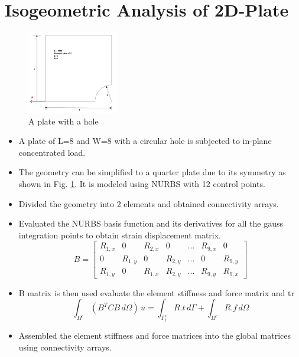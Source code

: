 \documentclass{beamer}
\begin{document}
\section{Isogeometric Analysis of 2D-Plate}
    \begin{figure}
    \begin{center}
    \includegraphics[width=4cm]{figures/plate2.png}
    \end{center}
    \caption{A plate with a hole}\label{Plate}
\end{figure}
  \begin{itemize}
    \item A plate of L=8 and W=8 with a circular hole is subjected to in-plane concentrated load.

    \item The geometry can be simplified to a quarter plate due to its symmetry as shown in Fig. \ref{Plate}. It is modeled using NURBS with 12 control points.

  \end{itemize}
  \newpage
  \begin{itemize}
    \item Divided the geometry into 2 elements and obtained connectivity arrays.
    \item Evaluated the NURBS basis function and its derivatives for all the gauss integration points to obtain strain displacement matrix.
    \begin{equation*}
        B=\begin{bmatrix}
        R_{1,x} & 0 & R_{2,x} & 0 & \dots & R_{9,x} & 0\\
        0 & R_{1,y} & 0 &R_{2,y} & \dots & 0 & R_{9,y}\\
        R_{1,y} & 0 &R_{1,x} &  R_{2,y} & \dots &  R_{9,y} &R_{9,x}
        \end{bmatrix}
    \end{equation*}
    \item B matrix is then used evaluate the element stiffness and force matrix and tr
    \begin{equation*}
        \int_{\Omega^e} (B^TCB  \,d\Omega)\,u = \int_{\Gamma^e_t} R.t \,d\Gamma +\int_{\Omega^e} R.f \,d\Omega
    \end{equation*}

    \item Assembled the element stiffness and force matrices into the global matrices using connectivity arrays.
    
  \end{itemize}
\end{document}
